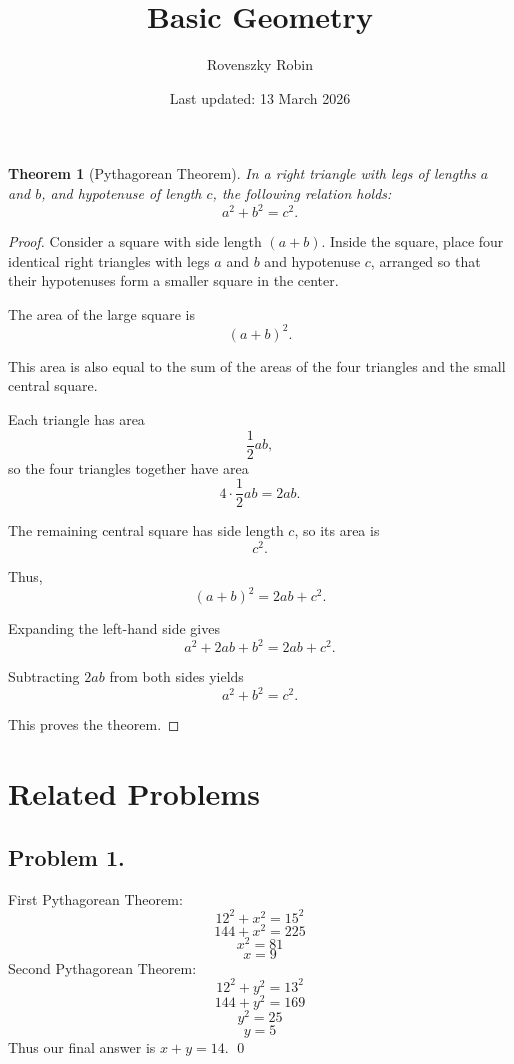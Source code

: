 \documentclass{article}
\title{Basic Geometry}
\author{Rovenszky Robin}
\date{Last updated: 13 March 2026}
\newtheorem{theorem}{Theorem}
\begin{document}
\maketitle

\begin{theorem}[Pythagorean Theorem]
In a right triangle with legs of lengths $a$ and $b$, and hypotenuse of length $c$, the following relation holds:
\[
a^2 + b^2 = c^2.
\]
\end{theorem}

\begin{proof}
Consider a square with side length $(a+b)$. Inside the square, place four identical right triangles with legs $a$ and $b$ and hypotenuse $c$, arranged so that their hypotenuses form a smaller square in the center.

The area of the large square is
\[
(a+b)^2.
\]

This area is also equal to the sum of the areas of the four triangles and the small central square.

Each triangle has area
\[
\frac{1}{2}ab,
\]
so the four triangles together have area
\[
4 \cdot \frac{1}{2}ab = 2ab.
\]

The remaining central square has side length $c$, so its area is
\[
c^2.
\]

Thus,
\[
(a+b)^2 = 2ab + c^2.
\]

Expanding the left-hand side gives
\[
a^2 + 2ab + b^2 = 2ab + c^2.
\]

Subtracting $2ab$ from both sides yields
\[
a^2 + b^2 = c^2.
\]

This proves the theorem.
\end{proof}

\newpage

\section{Related Problems}
\subsection{Problem 1.}

First Pythagorean Theorem:
\begin{equation}
    12^2 + x^2 = 15^2
\end{equation}
\begin{equation}
    144+x^2 = 225
\end{equation}
\begin{equation}
    x^2 = 81
\end{equation}
\begin{equation}
    x = 9
\end{equation}
Second Pythagorean Theorem:
\begin{equation}
    12^2 + y^2 = 13^2
\end{equation}
\begin{equation}
    144 + y^2 = 169
\end{equation}
\begin{equation}
    y^2 = 25
\end{equation}
\begin{equation}
    y = 5
\end{equation}
Thus our final answer is $x + y = 14$. \qed
\end{document}
